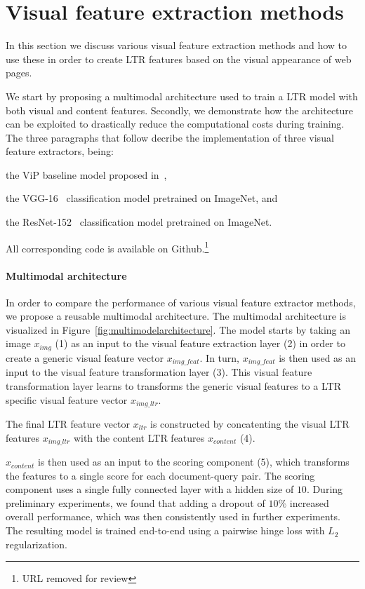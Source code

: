 
\section{Visual feature extraction methods}
In this section we discuss various visual feature extraction methods and how to use these in order to create \ac{LTR} features based on the visual appearance of web pages. 

We start by proposing a multimodal architecture used to train a \ac{LTR} model with both visual and content features. 
Secondly, we demonstrate how the architecture can be exploited to drastically reduce the computational costs during training. 
The three paragraphs that follow decribe the implementation of three visual feature extractors, being:
\begin{inparaenum}[(i)]
\item the ViP baseline model proposed in~\citet{fan2017learning}, 
\item the VGG-16~\cite{simonyan2014very} classification model pretrained on ImageNet, and
\item the ResNet-152~\cite{he2016deep} classification model pretrained on ImageNet.
\end{inparaenum} 

All corresponding code is available on Github.\footnote{URL removed for review}

\paragraph{Multimodal architecture}
In order to compare the performance of various visual feature extractor methods, we propose a reusable multimodal architecture. 
The multimodal architecture is visualized in Figure~\ref{fig:multimodelarchitecture}. 
The model starts by taking an image $x_{img}$ (1) as an input to the visual feature extraction layer (2) in order to create a generic visual feature vector $x_{img\_feat}$. In turn, $x_{img\_feat}$ is then used as an input to the visual feature transformation layer (3).
This visual feature transformation layer learns to transforms the generic visual features to a \ac{LTR} specific visual feature vector $x_{img\_ltr}$.

The final \ac{LTR} feature vector $x_{ltr}$ is constructed by concatenting the visual \ac{LTR} features $x_{img\_ltr}$ with the content \ac{LTR} features $x_{content}$ (4). 

$x_{content}$ is then used as an input to the scoring component (5), which transforms the features to a single score for each document-query pair. The scoring component uses a single fully connected layer with a hidden size of $10$. During preliminary experiments, we found that adding a dropout of $10\%$ increased overall performance, which was then consistently used in further experiments. The resulting model is trained end-to-end using a pairwise hinge loss with $L_2$ regularization. 

